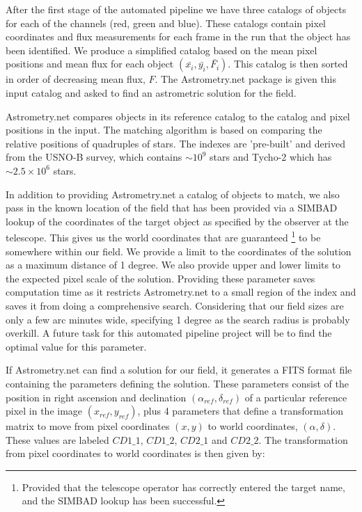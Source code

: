 After the first stage of the automated pipeline we have three catalogs of objects for each of the channels (red, green and blue). These catalogs contain pixel coordinates and flux measurements for each frame in the run that the object has been identified. We produce a simplified catalog based on the mean pixel positions and mean flux for each object $(\bar{x_i}, \bar{y_i}, \bar{F_i})$. This catalog is then sorted in order of decreasing mean flux, $F$. The Astrometry.net package is given this input catalog and asked to find an astrometric solution for the field. 

Astrometry.net compares objects in its reference catalog to the catalog and pixel positions in the input. The matching algorithm is based on comparing the relative positions of quadruples of stars. The indexes are 'pre-built' and derived from the USNO-B survey, which contains $\sim10^9$ stars and Tycho-2 which has $\sim2.5\times10^6$ stars. 

In addition to providing Astrometry.net a catalog of objects to match, we also pass in the known location of the field that has been provided via a SIMBAD lookup of the coordinates of the target object as specified by the observer at the telescope. This gives us the world coordinates that are guaranteed \footnote{Provided that the telescope operator has correctly entered the target name, and the SIMBAD lookup has been successful.} to be somewhere within our field. We provide a limit to the coordinates of the solution as a maximum distance of 1 degree. We also provide upper and lower limits to the expected pixel scale of the solution. Providing these parameter saves computation time as it restricts Astrometry.net to a small region of the index and saves it from doing a comprehensive search. Considering that our field sizes are only a few arc minutes wide, specifying 1 degree as the search radius is probably overkill. A future task for this automated pipeline project will be to find the optimal value for this parameter.

If Astrometry.net can find a solution for our field, it generates a FITS format file containing the parameters defining the solution. These parameters consist of the position in right ascension and declination $(\alpha_{ref}, \delta_{ref})$ of a particular reference pixel in the image $(x_{ref}, y_{ref})$, plus 4 parameters that define a transformation matrix to move from pixel coordinates $(x, y)$ to world coordinates, $(\alpha, \delta)$. These values are labeled $CD1\_1$, $CD1\_2$, $CD2\_1$ and $CD2\_2$. The transformation from pixel coordinates to world coordinates is then given by: 

